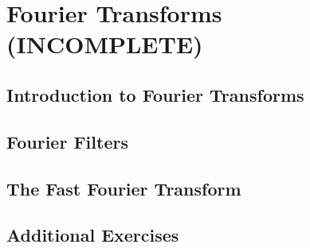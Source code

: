 \chapter{Fourier Transforms (INCOMPLETE)}

\section{Introduction to Fourier Transforms}

\newpage\section{Fourier Filters}



\newpage\section{The Fast Fourier Transform}



\newpage\section{Additional Exercises}





